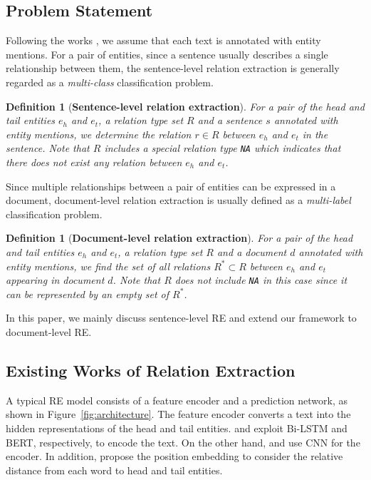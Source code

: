 \documentclass[11pt]{article}
\newtheorem{definition}[theorem]{Definition}
\newcommand{\head}{$e_{h}$\xspace}
\newcommand{\tail}{$e_{t}$\xspace}
\newcommand{\norel}{\texttt{NA}\xspace}
\renewcommand{\figurename}{Figure}
\begin{document}
\subsection{Problem Statement}
Following the works \cite{yao2019docred,wang2019fine}, we assume that each text is annotated with entity mentions.
For a pair of entities, since a sentence usually describes a single relationship between them, the sentence-level relation extraction is generally regarded as a \emph{multi-class} classification problem.
\begin{definition}[\textbf{Sentence-level relation extraction}] For a pair of the head and tail entities \head and \tail, a relation type set $R$ and a sentence $s$ annotated with entity mentions, we determine the relation $r \in R$ between \head and \tail in the sentence.
Note that $R$ includes a special relation type \norel which indicates that there does not exist any relation between \head and \tail.
\end{definition}


Since multiple relationships between a pair of entities can be expressed in a document,
document-level relation extraction is usually defined as a \emph{multi-label} classification problem.
\vspace{-0.02in}
\begin{definition}[\textbf{Document-level relation extraction}] For a pair of the head and tail entities \head and \tail, a relation type set $R$ and a document $d$ annotated with entity mentions, we find the set of all relations $R^* \subset R$ between \head and \tail appearing in document $d$. Note that $R$ does not include \norel in this case since it can be represented by an empty set of $R^*$.
\end{definition}

In this paper, we mainly discuss sentence-level RE and extend our framework to document-level RE.









\subsection{Existing Works of Relation Extraction}
\label{sec:existingworks}
A typical RE model consists of a feature encoder and a prediction network, as shown in \figurename~\ref{fig:architecture}.
The feature encoder converts a text into the hidden representations of the head and tail entities. 
 and  exploit Bi-LSTM and BERT, respectively, to encode the text.
On the other hand,  and  use CNN for the encoder. 
In addition,  propose the position embedding to consider the relative distance from each word to head and tail entities.  
\end{document}
